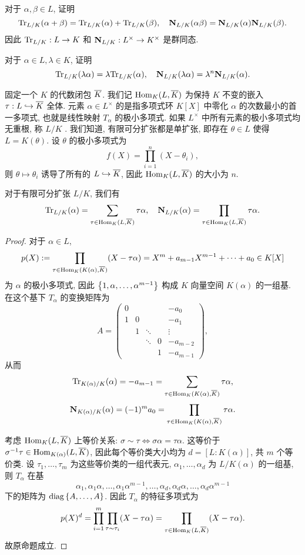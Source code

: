 \begin{exercise}
对于 $\alpha,\beta\in L$, 证明
  \[{\mathrm{Tr}}_{L/K}(\alpha+\beta)={\mathrm{Tr}}_{L/K}(\alpha)+{\mathrm{Tr}}_{L/K}(\beta),\quad
{\mathbf{N}}_{L/K}(\alpha\beta)={\mathbf{N}}_{L/K}(\alpha){\mathbf{N}}_{L/K}(\beta).\]
因此 ${\mathrm{Tr}}_{L/K}:L\to K$ 和 ${\mathbf{N}}_{L/K}:L^\times\to K^\times$ 是群同态.
\end{exercise}

\begin{exercise}
对于 $\alpha\in L,\lambda\in K$, 证明
  \[{\mathrm{Tr}}_{L/K}(\lambda\alpha)=\lambda{\mathrm{Tr}}_{L/K}(\alpha),\quad
  {\mathbf{N}}_{L/K}(\lambda\alpha)=\lambda^n{\mathbf{N}}_{L/K}(\alpha).\]
\end{exercise}

固定一个 $K$ 的代数闭包 $\overline K$. 我们记 ${\mathrm{Hom}}_K(L,\overline K)$ 为保持 $K$ 不变的嵌入 $\tau:L\hookrightarrow\overline K$ 全体. 元素 $\alpha\in L^\times$ 的是指多项式环 $K[X]$ 中零化 $\alpha$ 的次数最小的首一多项式, 也就是线性映射 $T_\alpha$ 的极小多项式. 如果 $L^\times$ 中所有元素的极小多项式均无重根, 称 $L/K$ . 我们知道, 有限可分扩张都是单扩张, 即存在 $\theta\in L$ 使得 $L=K(\theta)$. 设 $\theta$ 的极小多项式为
  \[f(X)=\prod_{i=1}^n (X-\theta_i),\]
则 $\theta\mapsto \theta_i$ 诱导了所有的 $L\hookrightarrow \overline K$, 因此 ${\mathrm{Hom}}_K(L,\overline K)$ 的大小为 $n$.

\begin{proposition}{}{}
对于有限可分扩张 $L/K$, 我们有
  \[{\mathrm{Tr}}_{L/K}(\alpha)=\sum_{\tau\in{\mathrm{Hom}}_K(L,\overline K)}\tau\alpha,\quad 
    {\mathbf{N}}_{L/K}(\alpha)=\prod_{\tau\in{\mathrm{Hom}}_K(L,\overline K)}\tau\alpha.\]
\end{proposition}
\begin{proof}
对于 $\alpha\in L$, 
  \[p(X):=\prod_{\tau\in{\mathrm{Hom}}_K(K(\alpha),\overline K)} (X-\tau\alpha)=X^m+a_{m-1} X^{m-1}+\cdots+a_0\in K[X]\]
为 $\alpha$ 的极小多项式, 因此 $\left\{1,\alpha,\dots,\alpha^{m-1}\right\}$ 构成 $K$ 向量空间 $K(\alpha)$ 的一组基. 在这个基下 $T_\alpha$ 的变换矩阵为
  \[A=\begin{pmatrix}
     0 &   &        &   &-a_0\\
     1 & 0 &        &   &-a_1\\
       & 1 & \ddots &   &\vdots\\
       &   & \ddots & 0 &-a_{m-2}\\
       &   &        & 1 &-a_{m-1}
  \end{pmatrix},\]
从而
  \[{\mathrm{Tr}}_{K(\alpha)/K}(\alpha)=-a_{m-1}=\sum_{\tau\in{\mathrm{Hom}}_K(K(\alpha),\overline K)}\tau\alpha,\]
  \[{\mathbf{N}}_{K(\alpha)/K}(\alpha)=(-1)^m a_0=\prod_{\tau\in{\mathrm{Hom}}_K(K(\alpha),\overline K)}\tau\alpha.\]

考虑 ${\mathrm{Hom}}_K(L,\overline K)$ 上等价关系: $\sigma\sim \tau\iff \sigma \alpha=\tau\alpha$. 这等价于 $\sigma^{-1}\tau\in{\mathrm{Hom}}_{K(\alpha)}(L,\overline K)$, 因此每个等价类大小均为 $d=[L:K(\alpha)]$, 共 $m$ 个等价类. 设 $\tau_1,\dots,\tau_m$ 为这些等价类的一组代表元, $\alpha_1,\dots,\alpha_d$ 为 $L/K(\alpha)$ 的一组基, 则 $T_\alpha$ 在基 
	\[\alpha_1,\alpha_1\alpha,\dots,\alpha_1\alpha^{m-1},\dots,
	\alpha_d,\alpha_d\alpha,\dots,\alpha_d\alpha^{m-1}\]
下的矩阵为 ${\mathrm{diag}}\left\{A,\dots,A\right\}$. 因此 $T_\alpha$ 的特征多项式为
	\[p(X)^d=\prod_{i=1}^m\prod_{\tau\sim\tau_i}(X-\tau \alpha)=\prod_{\tau\in{\mathrm{Hom}}_K(L,\overline K)}(X-\tau\alpha).\]
故原命题成立.
\end{proof}

